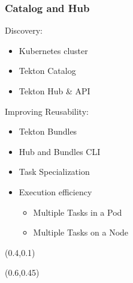 \documentclass[aspectratio=169,11pt,hyperref={colorlinks=true}]{beamer}
\begin{document}
\begin{grayframe}
  \frametitle{Catalog and Hub}
  Discovery:
  \begin{itemize}
    \item Kubernetes cluster
    \item Tekton Catalog
    \item Tekton Hub \& API
  \end{itemize}
  \vspace{0.03\paperheight}
  Improving Reusability:
  \begin{itemize}
    \item Tekton Bundles
    \item Hub and Bundles CLI
    \item Task Specialization
    \item Execution efficiency
    \begin{itemize}
      \item Multiple Tasks in a Pod
      \item Multiple Tasks on a Node
    \end{itemize}
  \end{itemize}
  \begin{textblock*}{0.4\paperwidth}(0.4\paperwidth,0.1\paperheight)
  \end{textblock*}
  \begin{textblock*}{0.3\paperwidth}(0.6\paperwidth,0.45\paperheight)

\end{textblock*}
\end{grayframe}
\end{document}
